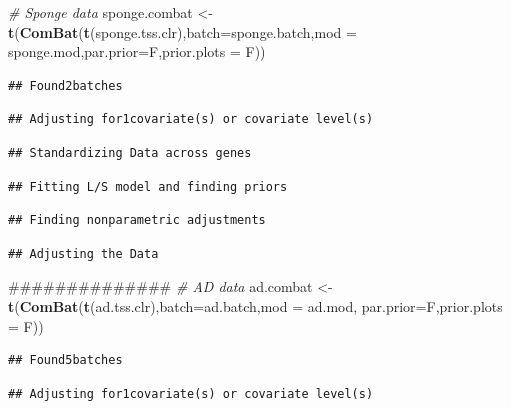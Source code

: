 \documentclass[]{book}
\newenvironment{Shaded}{\begin{snugshade}}{\end{snugshade}}
\newcommand{\KeywordTok}[1]{\textcolor[rgb]{0.13,0.29,0.53}{\textbf{#1}}}
\newcommand{\DataTypeTok}[1]{\textcolor[rgb]{0.13,0.29,0.53}{#1}}
\newcommand{\StringTok}[1]{\textcolor[rgb]{0.31,0.60,0.02}{#1}}
\newcommand{\CommentTok}[1]{\textcolor[rgb]{0.56,0.35,0.01}{\textit{#1}}}
\newcommand{\NormalTok}[1]{#1}
\begin{document}
\begin{Shaded}
\begin{Highlighting}[]
\CommentTok{# Sponge data}
\NormalTok{sponge.combat <-}\StringTok{ }\KeywordTok{t}\NormalTok{(}\KeywordTok{ComBat}\NormalTok{(}\KeywordTok{t}\NormalTok{(sponge.tss.clr),}\DataTypeTok{batch=}\NormalTok{sponge.batch,}\DataTypeTok{mod =}\NormalTok{ sponge.mod,}\DataTypeTok{par.prior=}\NormalTok{F,}\DataTypeTok{prior.plots =}\NormalTok{ F))}
\end{Highlighting}
\end{Shaded}

\begin{verbatim}
## Found2batches
\end{verbatim}

\begin{verbatim}
## Adjusting for1covariate(s) or covariate level(s)
\end{verbatim}

\begin{verbatim}
## Standardizing Data across genes
\end{verbatim}

\begin{verbatim}
## Fitting L/S model and finding priors
\end{verbatim}

\begin{verbatim}
## Finding nonparametric adjustments
\end{verbatim}

\begin{verbatim}
## Adjusting the Data
\end{verbatim}

\begin{Shaded}
\begin{Highlighting}[]
\NormalTok{##############}
\CommentTok{# AD data}
\NormalTok{ad.combat <-}\StringTok{ }\KeywordTok{t}\NormalTok{(}\KeywordTok{ComBat}\NormalTok{(}\KeywordTok{t}\NormalTok{(ad.tss.clr),}\DataTypeTok{batch=}\NormalTok{ad.batch,}\DataTypeTok{mod =}\NormalTok{ ad.mod, }\DataTypeTok{par.prior=}\NormalTok{F,}\DataTypeTok{prior.plots =}\NormalTok{ F))}
\end{Highlighting}
\end{Shaded}

\begin{verbatim}
## Found5batches
\end{verbatim}

\begin{verbatim}
## Adjusting for1covariate(s) or covariate level(s)
\end{verbatim}
\end{document}
